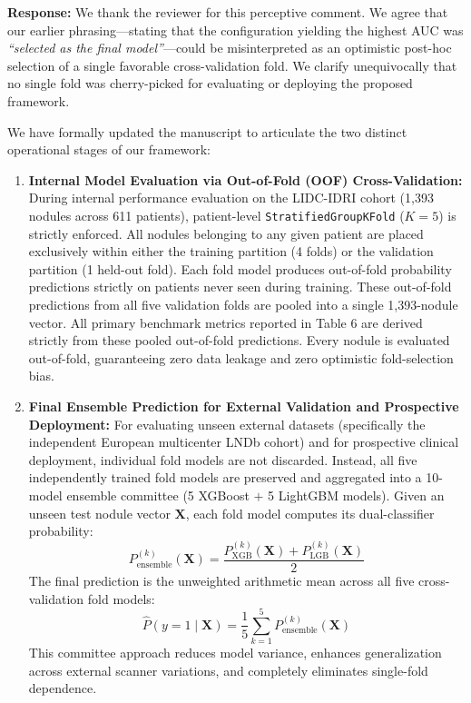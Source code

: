 \documentclass[11pt,a4paper]{article}
\newenvironment{authorresponse}{\par\begingroup\color{authorblue}}{\endgroup\par}
\newcommand{\manuscript}[1]{\textit{``#1''}}
\begin{document}
\begin{authorresponse}
\textbf{Response:}
We thank the reviewer for this perceptive comment. We agree that our earlier phrasing---stating that the configuration yielding the highest AUC was \manuscript{selected as the final model}---could be misinterpreted as an optimistic post-hoc selection of a single favorable cross-validation fold. We clarify unequivocally that no single fold was cherry-picked for evaluating or deploying the proposed framework.

We have formally updated the manuscript to articulate the two distinct operational stages of our framework:
\begin{enumerate}[leftmargin=2em]
  \item \textbf{Internal Model Evaluation via Out-of-Fold (OOF) Cross-Validation:}
  During internal performance evaluation on the LIDC-IDRI cohort (1,393 nodules across 611 patients), patient-level \texttt{StratifiedGroupKFold} ($K = 5$) is strictly enforced. All nodules belonging to any given patient are placed exclusively within either the training partition (4 folds) or the validation partition (1 held-out fold). Each fold model produces out-of-fold probability predictions strictly on patients never seen during training. These out-of-fold predictions from all five validation folds are pooled into a single 1,393-nodule vector. All primary benchmark metrics reported in Table 6 are derived strictly from these pooled out-of-fold predictions. Every nodule is evaluated out-of-fold, guaranteeing zero data leakage and zero optimistic fold-selection bias.
  
  \item \textbf{Final Ensemble Prediction for External Validation and Prospective Deployment:}
  For evaluating unseen external datasets (specifically the independent European multicenter LNDb cohort) and for prospective clinical deployment, individual fold models are not discarded. Instead, all five independently trained fold models are preserved and aggregated into a 10-model ensemble committee (5 XGBoost $+$ 5 LightGBM models). Given an unseen test nodule vector $\mathbf{X}$, each fold model computes its dual-classifier probability:
  \[
  P^{(k)}_{\mathrm{ensemble}}(\mathbf{X}) = \frac{P^{(k)}_{\mathrm{XGB}}(\mathbf{X}) + P^{(k)}_{\mathrm{LGB}}(\mathbf{X})}{2}
  \]
  The final prediction is the unweighted arithmetic mean across all five cross-validation fold models:
  \[
  \hat{P}(y = 1 \mid \mathbf{X}) = \frac{1}{5}\sum_{k=1}^{5} P^{(k)}_{\mathrm{ensemble}}(\mathbf{X})
  \]
  This committee approach reduces model variance, enhances generalization across external scanner variations, and completely eliminates single-fold dependence.
\end{enumerate}


\end{authorresponse}
\end{document}
